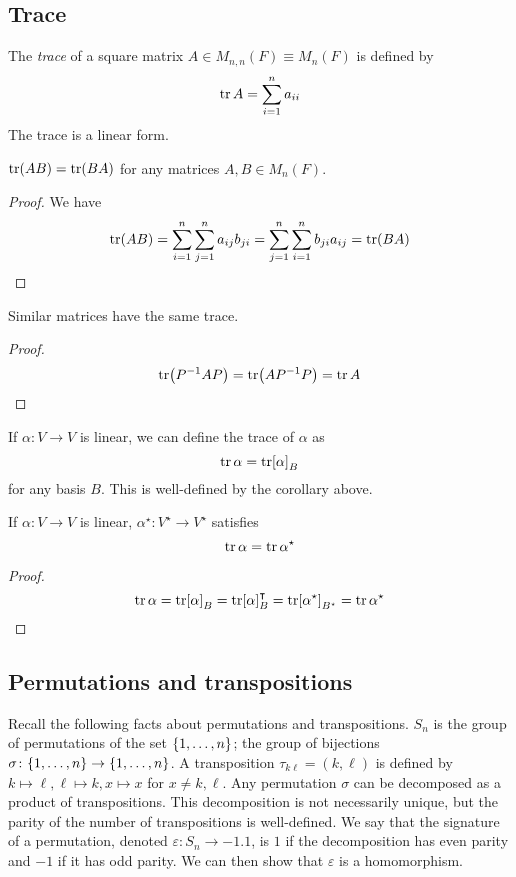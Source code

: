 \subsection{Trace}
\begin{definition}
	The \textit{trace} of a square matrix \( A \in M_{n,n}(F) \equiv M_n(F) \) is defined by
	\[
		\tr A = \sum_{i=1}^n a_{ii}
	\]
	The trace is a linear form.
\end{definition}
\begin{lemma}
	\( \tr (AB) = \tr (BA) \) for any matrices \( A, B \in M_n(F) \).
\end{lemma}
\begin{proof}
	We have
	\[
		\tr (AB) = \sum_{i=1}^n \sum_{j=1}^n a_{ij} b_{ji} = \sum_{j=1}^n \sum_{i=1}^n b_{ji} a_{ij} = \tr (BA)
	\]
\end{proof}
\begin{corollary}
	Similar matrices have the same trace.
\end{corollary}
\begin{proof}
	\[
		\tr(P^{-1}AP) = \tr (A P^{-1} P) = \tr A
	\]
\end{proof}
\begin{definition}
	If \( \alpha \colon V \to V \) is linear, we can define the trace of \( \alpha \) as
	\[
		\tr \alpha = \tr [\alpha]_B
	\]
	for any basis \( B \).
	This is well-defined by the corollary above.
\end{definition}
\begin{lemma}
	If \( \alpha \colon V \to V \) is linear, \( \alpha^\star \colon V^\star \to V^\star \) satisfies
	\[
		\tr \alpha = \tr \alpha^\star
	\]
\end{lemma}
\begin{proof}
	\[
		\tr \alpha = \tr [\alpha]_B = \tr [\alpha]_B^\intercal = \tr [\alpha^\star]_{B^\star} = \tr \alpha^\star
	\]
\end{proof}

\subsection{Permutations and transpositions}
Recall the following facts about permutations and transpositions.
\( S_n \) is the group of permutations of the set \( \qty{1, \dots, n} \); the group of bijections \( \sigma \colon \qty{1, \dots, n} \to \qty{1, \dots, n} \).
A transposition \( \tau_{k \ell} = (k, \ell) \) is defined by \( k \mapsto \ell, \ell \mapsto k, x \mapsto x \) for \( x \neq k, \ell \).
Any permutation \( \sigma \) can be decomposed as a product of transpositions.
This decomposition is not necessarily unique, but the parity of the number of transpositions is well-defined.
We say that the signature of a permutation, denoted \( \varepsilon \colon S_n \to \qty{-1, 1} \), is \( 1 \) if the decomposition has even parity and \( -1 \) if it has odd parity.
We can then show that \( \varepsilon \) is a homomorphism.


